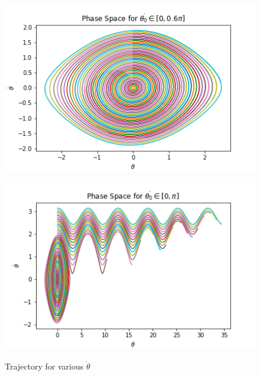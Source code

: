 \documentclass[12pt]{article}
\newenvironment{problem}[2][]{\begin{trivlist}
\item[\hskip \labelsep {\bfseries #1}\hskip \labelsep {\bfseries #2.}]}{\end{trivlist}}
\begin{document}
\begin{problem}{1}
\begin{figure}[ht!]
	\centering
	\begin{minipage}[b]{0.4\textwidth}
		\includegraphics[scale=0.6]{../figures/phaseSpaceDot.png}
		\label{phaseDot}
	\end{minipage}
	\hfill
	\begin{minipage}[b]{0.4\textwidth}
		\includegraphics[scale=0.6]{../figures/phaseSpaceDot2.png}
		\label{phaseDot2}
	\end{minipage}
	\caption{Trajectory for various $\dot{\theta}$}
\end{figure}
\end{problem}
 
\end{document}
